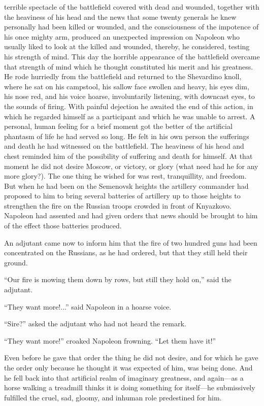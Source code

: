  terrible spectacle of the battlefield covered with dead and
wounded, together with the heaviness of his head and the news
that some twenty generals he knew personally had been killed or
wounded, and the consciousness of the impotence of his once
mighty arm, produced an unexpected impression on Napoleon who
usually liked to look at the killed and wounded, thereby, he
considered, testing his strength of mind. This day the horrible
appearance of the battlefield overcame that strength of mind
which he thought constituted his merit and his greatness. He rode
hurriedly from the battlefield and returned to the Shevardino
knoll, where he sat on his campstool, his sallow face swollen and
heavy, his eyes dim, his nose red, and his voice hoarse,
involuntarily listening, with downcast eyes, to the sounds of
firing.  With painful dejection he awaited the end of this
action, in which he regarded himself as a participant and which
he was unable to arrest. A personal, human feeling for a brief
moment got the better of the artificial phantasm of life he had
served so long. He felt in his own person the sufferings and
death he had witnessed on the battlefield. The heaviness of his
head and chest reminded him of the possibility of suffering and
death for himself. At that moment he did not desire Moscow, or
victory, or glory (what need had he for any more glory?). The one
thing he wished for was rest, tranquillity, and freedom. But when
he had been on the Semenovsk heights the artillery commander had
proposed to him to bring several batteries of artillery up to
those heights to strengthen the fire on the Russian troops
crowded in front of Knyazkovo.  Napoleon had assented and had
given orders that news should be brought to him of the effect
those batteries produced.

An adjutant came now to inform him that the fire of two hundred
guns had been concentrated on the Russians, as he had ordered,
but that they still held their ground.

``Our fire is mowing them down by rows, but still they hold on,''
said the adjutant.

``They want more!...'' said Napoleon in a hoarse voice.

``Sire?'' asked the adjutant who had not heard the remark.

``They want more!'' croaked Napoleon frowning. ``Let them have
it!''

Even before he gave that order the thing he did not desire, and
for which he gave the order only because he thought it was
expected of him, was being done. And he fell back into that
artificial realm of imaginary greatness, and again---as a horse
walking a treadmill thinks it is doing something for itself---he
submissively fulfilled the cruel, sad, gloomy, and inhuman role
predestined for him.

